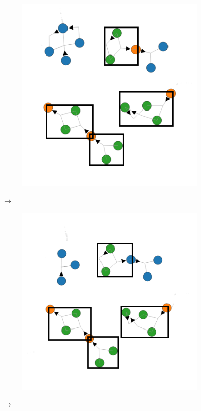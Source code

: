     \begin{figure}[H]
        \centering
        \begin{subfigure}{0.4\linewidth}
            \includegraphics[width=\textwidth]{diagrams/all-diagrams.png}
        \end{subfigure}
        $\longrightarrow$
        \begin{subfigure}{0.4\linewidth}
            \includegraphics[width=\textwidth]{diagrams/all-diagrams-r1.png}
        \end{subfigure}
        $\longrightarrow$
    \end{figure}
